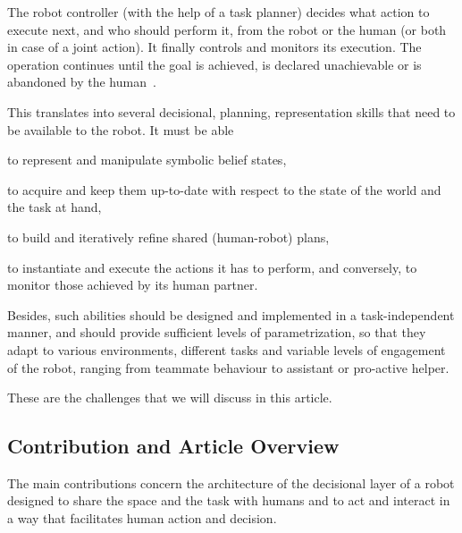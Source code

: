 \documentclass[preprint,3p,times]{elsarticle}
\begin{document}
The robot controller (with the help of a task planner) decides what action to
execute next, and who should perform it, from the robot or the human (or both in
case of a joint action). It finally controls and monitors its execution. The
operation continues until the goal is achieved, is declared unachievable or is
abandoned by the human~\cite{Klein2004}.

\begin{inparaenum}

This translates into several decisional, planning, representation skills that
need to be available to the robot. It must be able \item to represent and
manipulate symbolic belief states, \item to acquire and keep them up-to-date
with respect to the state of the world and the task at hand, \item to build and
iteratively refine shared (human-robot) plans, \item to instantiate and execute
the actions it has to perform, and conversely, to monitor those achieved by
its human partner.

\end{inparaenum}

Besides, such abilities should be designed and implemented in a task-independent
manner, and should provide sufficient levels of parametrization, so that they adapt to
various environments, different tasks and variable levels of engagement of the
robot, ranging from teammate behaviour to assistant or pro-active helper.

These are the challenges that we will discuss in this article.

\subsection{Contribution and Article Overview}

The main contributions concern the architecture of the decisional layer of a robot designed to share 
the space and the task with humans and to act and interact in a way that facilitates human action and decision.
\end{document}
